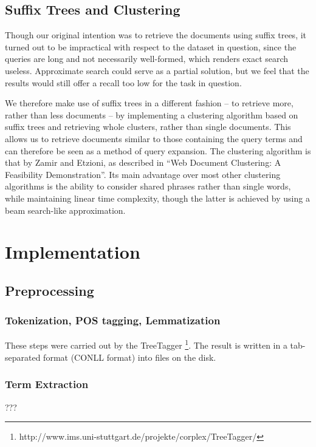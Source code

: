 \documentclass[11pt, a4paper, abstraction]{scrartcl}
\begin{document}
\subsection{Suffix Trees and Clustering}
Though our original intention was to retrieve the documents using suffix trees, it turned out to be impractical with respect to the dataset in question, since the queries are long and not necessarily well-formed, which renders exact search useless. Approximate search could serve as a partial solution, but we feel that the results would still offer a recall too low for the task in question.

We therefore make use of suffix trees in a different fashion -- to retrieve more, rather than less documents -- by implementing a clustering algorithm based on suffix trees and retrieving whole clusters, rather than single documents. This allows us to retrieve documents similar to those containing the query terms and can therefore be seen as a method of query expansion. The clustering algorithm is that by Zamir and Etzioni, as described in ``Web Document Clustering: A Feasibility Demonstration''. Its main advantage over most other clustering algorithms is the ability to consider shared phrases rather than single words, while maintaining linear time complexity, though the latter is achieved by using a beam search-like approximation.

\section{Implementation}

\subsection{Preprocessing}

\subsubsection{Tokenization, POS tagging, Lemmatization}
These steps were carried out by the TreeTagger \footnote{http://www.ims.uni-stuttgart.de/projekte/corplex/TreeTagger/}. The result is written in a tab-separated format (CONLL format) into files on the disk.

\subsubsection{Term Extraction}

???
\end{document}
